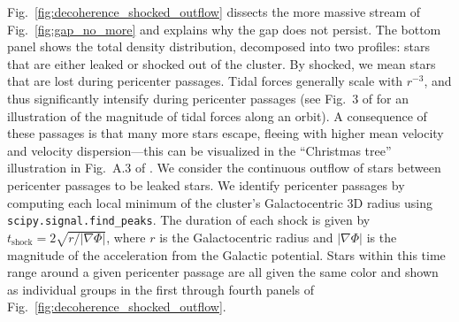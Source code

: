        Fig.~\ref{fig:decoherence_shocked_outflow} dissects the more massive stream of Fig.~\ref{fig:gap_no_more} and explains why the gap does not persist. The bottom panel shows the total density distribution, decomposed into two profiles: stars that are either leaked or shocked out of the cluster. By shocked, we mean stars that are lost during pericenter passages. Tidal forces generally scale with $r^{-3}$, and thus significantly intensify during pericenter passages (see Fig.~3 of \citet{2004AJ....127.2753D} for an illustration of the magnitude of tidal forces along an orbit). A consequence of these passages is that many more stars escape, fleeing with higher mean velocity and velocity dispersion—this can be visualized in the ``Christmas tree'' illustration in Fig.~A.3 of \citet{2012A&A...546L...7M}. We consider the continuous outflow of stars between pericenter passages to be leaked stars. We identify pericenter passages by computing each local minimum of the cluster's Galactocentric 3D radius using \texttt{scipy.signal.find\_peaks}. The duration of each shock is given by $t_{\textrm{shock}} = 2\sqrt{r/|\nabla\Phi|}$, where $r$ is the Galactocentric radius and $|\nabla\Phi|$ is the magnitude of the acceleration from the Galactic potential. Stars within this time range around a given pericenter passage are all given the same color and shown as individual groups in the first through fourth panels of Fig.~\ref{fig:decoherence_shocked_outflow}.





